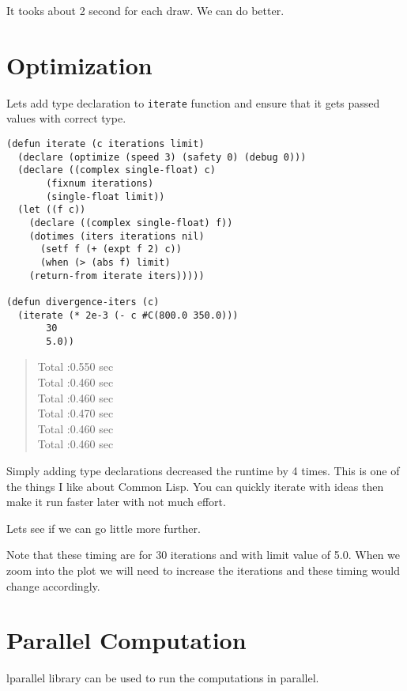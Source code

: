 \documentclass[11pt,a4paper]{article}
\begin{document}
It tooks about 2 second for each draw. We can do better. 

\section{Optimization}
\label{sec:org772a1ed}
Lets add type declaration to \texttt{iterate} function and ensure that it gets passed values with correct type. 
\begin{lstlisting}
(defun iterate (c iterations limit)
  (declare (optimize (speed 3) (safety 0) (debug 0)))
  (declare ((complex single-float) c)
	   (fixnum iterations)
	   (single-float limit))
  (let ((f c))
    (declare ((complex single-float) f))
    (dotimes (iters iterations nil)
      (setf f (+ (expt f 2) c))
      (when (> (abs f) limit)
	(return-from iterate iters)))))

(defun divergence-iters (c)
  (iterate (* 2e-3 (- c #C(800.0 350.0)))
	   30
	   5.0))
\end{lstlisting}

\begin{verse}
Total  :0.550 sec\\
Total  :0.460 sec\\
Total  :0.460 sec\\
Total  :0.470 sec\\
Total  :0.460 sec\\
Total  :0.460 sec\\
\end{verse}

Simply adding type declarations decreased the runtime by 4 times. This is one of the things I like about Common Lisp. You can quickly iterate with ideas then make it run faster later with not much effort. 

Lets see if we can go little more further. 

Note that these timing are for 30 iterations and with limit value of 5.0. When we zoom into the plot we will need to increase the iterations and these timing would change accordingly. 

\section{Parallel Computation}
\label{sec:orga023c68}
lparallel library can be used to run the computations in parallel. 
\end{document}
